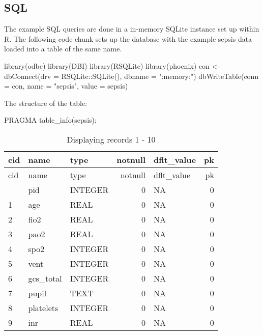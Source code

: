 \documentclass[
  letterpaper,
  DIV=11,
  numbers=noendperiod]{scrartcl}
\newenvironment{Shaded}{\begin{snugshade}}{\end{snugshade}}
\newcommand{\AttributeTok}[1]{\textcolor[rgb]{0.40,0.45,0.13}{#1}}
\newcommand{\FunctionTok}[1]{\textcolor[rgb]{0.28,0.35,0.67}{#1}}
\newcommand{\NormalTok}[1]{\textcolor[rgb]{0.00,0.23,0.31}{#1}}
\newcommand{\OtherTok}[1]{\textcolor[rgb]{0.00,0.23,0.31}{#1}}
\newcommand{\SpecialCharTok}[1]{\textcolor[rgb]{0.37,0.37,0.37}{#1}}
\newcommand{\StringTok}[1]{\textcolor[rgb]{0.13,0.47,0.30}{#1}}
\begin{document}
\subsection{SQL}\label{sql}

The example SQL queries are done in a in-memory SQLite instance set up
within R. The following code chunk sets up the database with the example
sepsis data loaded into a table of the same name.

\begin{Shaded}
\begin{Highlighting}[]
\FunctionTok{library}\NormalTok{(odbc)}
\FunctionTok{library}\NormalTok{(DBI)}
\FunctionTok{library}\NormalTok{(RSQLite)}
\FunctionTok{library}\NormalTok{(phoenix)}
\NormalTok{con }\OtherTok{\textless{}{-}} \FunctionTok{dbConnect}\NormalTok{(}\AttributeTok{drv =}\NormalTok{ RSQLite}\SpecialCharTok{::}\FunctionTok{SQLite}\NormalTok{(), }\AttributeTok{dbname =} \StringTok{":memory:"}\NormalTok{)}
\FunctionTok{dbWriteTable}\NormalTok{(}\AttributeTok{conn =}\NormalTok{ con, }\AttributeTok{name =} \StringTok{"sepsis"}\NormalTok{, }\AttributeTok{value =}\NormalTok{ sepsis)}
\end{Highlighting}
\end{Shaded}

The structure of the table:

\begin{Shaded}
\begin{Highlighting}[]
\NormalTok{PRAGMA table\_info(sepsis);}
\end{Highlighting}
\end{Shaded}

\begin{longtable}[]{@{}lllrlr@{}}
\caption{Displaying records 1 - 10}\tabularnewline
\toprule\noalign{}
cid & name & type & notnull & dflt\_value & pk \\
\midrule\noalign{}
\endfirsthead
\toprule\noalign{}
cid & name & type & notnull & dflt\_value & pk \\
\midrule\noalign{}
\endhead
\bottomrule\noalign{}
\endlastfoot
0 & pid & INTEGER & 0 & NA & 0 \\
1 & age & REAL & 0 & NA & 0 \\
2 & fio2 & REAL & 0 & NA & 0 \\
3 & pao2 & REAL & 0 & NA & 0 \\
4 & spo2 & INTEGER & 0 & NA & 0 \\
5 & vent & INTEGER & 0 & NA & 0 \\
6 & gcs\_total & INTEGER & 0 & NA & 0 \\
7 & pupil & TEXT & 0 & NA & 0 \\
8 & platelets & INTEGER & 0 & NA & 0 \\
9 & inr & REAL & 0 & NA & 0 \\
\end{longtable}
\end{document}
